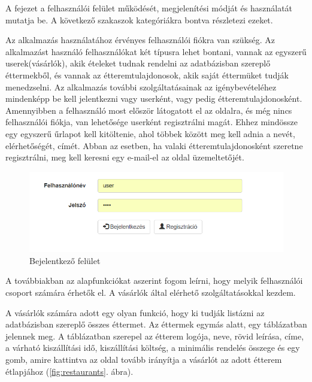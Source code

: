 
A fejezet a felhasználói felület működését, megjelenítési módját és használatát mutatja be. A következő szakaszok kategóriákra bontva részletezi ezeket.


Az alkalmazás használatához érvényes felhasználói fiókra van szükség. Az alkalmazást használó felhasználókat két típusra lehet bontani, vannak az egyszerű userek(vásárlók), akik ételeket tudnak rendelni az adatbázisban szereplő éttermekből, és vannak az étteremtulajdonosok, akik saját éttermüket tudják menedzselni. Az alkalmazás további szolgáltatásainak az igénybevételéhez mindenképp be kell jelentkezni vagy userként, vagy pedig étteremtulajdonosként. Amennyibben a felhasználó most először látogatott el az oldalra, és még nincs felhasználói fiókja, van lehetősége userként regisztrálni magát. Ehhez mindössze egy egyszerű űrlapot kell kitöltenie, ahol többek között meg kell adnia a nevét, elérhetőségét, címét. Abban az esetben, ha valaki étteremtulajdonosként szeretne regisztrálni, meg kell keresni egy e-mail-el az oldal üzemeltetőjét.

\begin{figure}
\centering
\includegraphics[scale=0.8]{kepek/login.png}
\caption{Bejelentkező felület}
\label{fig:architecture}
\end{figure}


A továbbiakban az alapfunkciókat aszerint fogom leírni, hogy melyik felhasználói csoport számára érhetők el. A vásárlók által elérhető szolgáltatásokkal kezdem.


A vásárlók számára adott egy olyan funkció, hogy ki tudják listázni az adatbázisban szereplő összes éttermet. Az éttermek egymás alatt, egy táblázatban jelennek meg. A táblázatban szerepel az étterem logója, neve, rövid leírása, címe, a várható kiszállítási idő, kiszállítási költség, a minimális rendelés összege és egy gomb, amire kattintva az oldal tovább irányítja a vásárlót az adott étterem étlapjához (\ref{fig:restaurants}. ábra).

